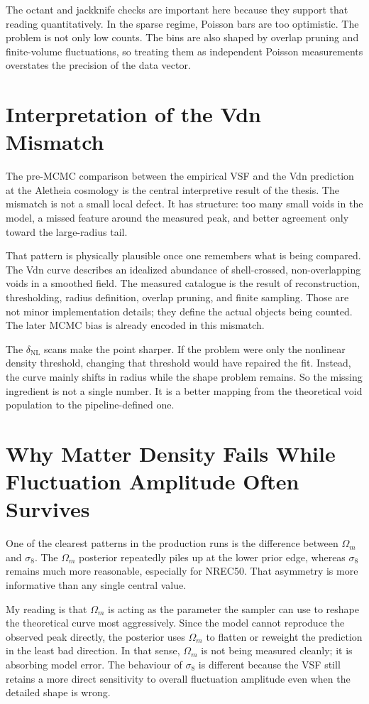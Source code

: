 \documentclass[12pt]{report}
\begin{document}
The octant and jackknife checks are important here because they support that reading quantitatively. In the sparse regime, Poisson bars are too optimistic. The problem is not only low counts. The bins are also shaped by overlap pruning and finite-volume fluctuations, so treating them as independent Poisson measurements overstates the precision of the data vector.

\section{Interpretation of the Vdn Mismatch}

The pre-MCMC comparison between the empirical VSF and the Vdn prediction at the Aletheia cosmology is the central interpretive result of the thesis. The mismatch is not a small local defect. It has structure: too many small voids in the model, a missed feature around the measured peak, and better agreement only toward the large-radius tail.

That pattern is physically plausible once one remembers what is being compared. The Vdn curve describes an idealized abundance of shell-crossed, non-overlapping voids in a smoothed field. The measured catalogue is the result of reconstruction, thresholding, radius definition, overlap pruning, and finite sampling. Those are not minor implementation details; they define the actual objects being counted. The later MCMC bias is already encoded in this mismatch.

The $\delta_\mathrm{NL}$ scans make the point sharper. If the problem were only the nonlinear density threshold, changing that threshold would have repaired the fit. Instead, the curve mainly shifts in radius while the shape problem remains. So the missing ingredient is not a single number. It is a better mapping from the theoretical void population to the pipeline-defined one.

\section{Why Matter Density Fails While Fluctuation Amplitude Often Survives}

One of the clearest patterns in the production runs is the difference between $\Omega_m$ and $\sigma_8$. The $\Omega_m$ posterior repeatedly piles up at the lower prior edge, whereas $\sigma_8$ remains much more reasonable, especially for NREC50. That asymmetry is more informative than any single central value.

My reading is that $\Omega_m$ is acting as the parameter the sampler can use to reshape the theoretical curve most aggressively. Since the model cannot reproduce the observed peak directly, the posterior uses $\Omega_m$ to flatten or reweight the prediction in the least bad direction. In that sense, $\Omega_m$ is not being measured cleanly; it is absorbing model error. The behaviour of $\sigma_8$ is different because the VSF still retains a more direct sensitivity to overall fluctuation amplitude even when the detailed shape is wrong.
\end{document}

